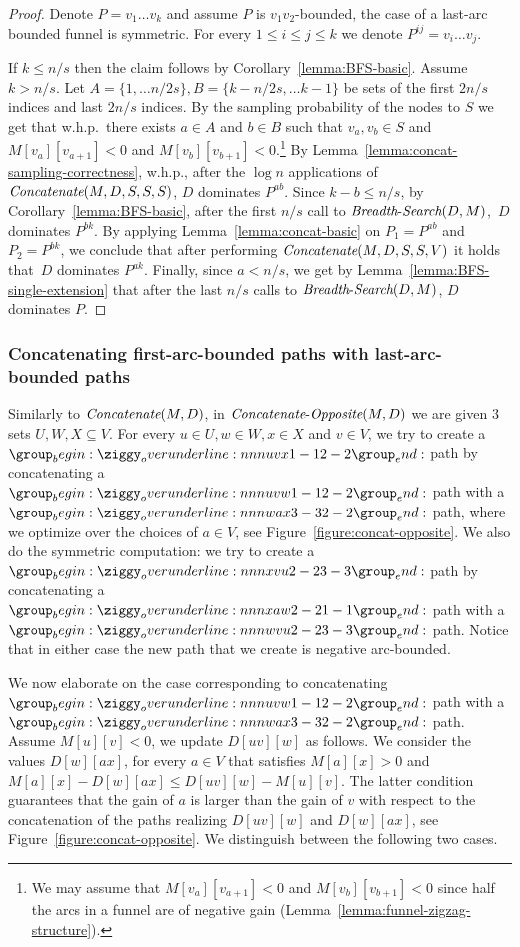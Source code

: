 \documentclass[11pt]{article}
\newcommand{\Concat}{\mbox{{\it Concatenate}}}
\newcommand{\CO}{\mbox{{\it Concatenate}-{\it Opposite}}}
\newcommand{\BFS}{\mbox{{\it Breadth}-{\it Search}}}
\begin{document}
\begin{proof}
Denote $P= v_1 \ldots v_k$ and assume $P$ is $v_1v_2$-bounded, the case of a last-arc bounded funnel is symmetric. For every $1\le i \le j\le k$ we denote $P^{ij}=v_i\ldots v_j$.

If $k \le n/s$ then the claim follows by Corollary~\ref{lemma:BFS-basic}. Assume $k > n/s$. Let $A = \{1,\ldots n/2s\},B = \{k-n/2s , \ldots k-1\}$ be sets of  the first $2n/s$ indices and last $2n/s$ indices. By the sampling probability of the nodes to $S$ we get that w.h.p.\ there exists $a \in A$ and $b \in B$ such that $v_{a},v_{b}\in S$ and $M[v_{a}][v_{a + 1}]<0$ and $M[v_{b}][v_{b + 1}]<0$.\footnote{We may assume that $M[v_{a}][v_{a + 1}]<0$ and $M[v_{b}][v_{b + 1}]<0$ since half the arcs in a funnel are of negative gain (Lemma~\ref{lemma:funnel-zigzag-structure}).} By Lemma~\ref{lemma:concat-sampling-correctness}, w.h.p., after the $\log n$ applications of $\Concat(M,D,S,S,S)$, $D$ dominates $P^{a b}$. Since $k - b \le n/s$, by Corollary~\ref{lemma:BFS-basic}, after the first $n/s$ call to $\BFS(D,M)$,~$D$ dominates $P^{b k}$. By applying Lemma~\ref{lemma:concat-basic} on $P_1= P^{a b}$ and $P_2=P^{b k}$, we conclude that after performing $\Concat(M,D,S,S,V)$ it holds that~$D$ dominates $P^{a k}$. Finally, since $a < n/s$, we get by Lemma~\ref{lemma:BFS-single-extension} that after the last $n/s$ calls to $\BFS(D,M)$, $D$ dominates $P$.
\end{proof}

\subsubsection{Concatenating first-arc-bounded paths with last-arc-bounded paths}\label{section:CO}
Similarly to $\Concat(M,D)$, in $\CO(M,D)$ we are given $3$ sets $U,W,X\subseteq V$. For every $u\in U,w\in W,x\in X$ and $v\in V$, we try to create a $\overunderline{uvx}{1-1}{2-2}$ path by concatenating a $\overunderline{uvw}{1-1}{2-2}$ path with a $\overunderline{wax}{3-3}{2-2}$ path, where we optimize over the choices of $a \in V$, see Figure~\ref{figure:concat-opposite}. We also do the symmetric computation: we try to create a $\overunderline{xvu}{2-2}{3-3}$ path by concatenating a $\overunderline{xaw}{2-2}{1-1}$ path with a $\overunderline{wvu}{2-2}{3-3}$ path.
Notice that in either case the new path that we create is negative arc-bounded.


We now elaborate on the case corresponding to concatenating  $\overunderline{uvw}{1-1}{2-2}$ path with a $\overunderline{wax}{3-3}{2-2}$ path.
Assume $M[u][v]<0$, we update $D[uv][w]$ as follows. We consider the values $D[w][ax]$, for every $a\in V$ that satisfies $M[a][x]>0$ and $M[a][x]-D[w][ax]\le D[uv][w]-M[u][v]$. The latter condition guarantees that the gain of $a$ is larger than the gain of $v$ with respect to the concatenation of the paths realizing $D[uv][w]$ and $D[w][ax]$, see Figure~\ref{figure:concat-opposite}.
We distinguish between the following two cases.
\end{document}
